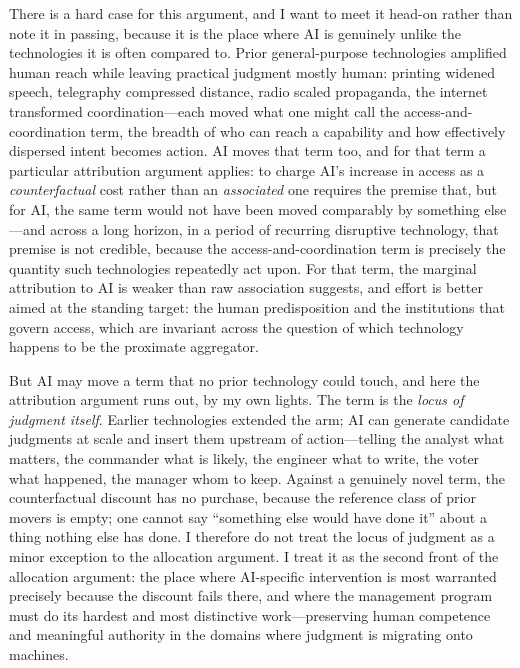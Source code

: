 \documentclass[11pt]{article}
\begin{document}
There is a hard case for this argument, and I want to meet it head-on rather than note it in passing, because it is the place where AI is genuinely unlike the technologies it is often compared to. Prior general-purpose technologies amplified human reach while leaving practical judgment mostly human: printing widened speech, telegraphy compressed distance, radio scaled propaganda, the internet transformed coordination---each moved what one might call the access-and-coordination term, the breadth of who can reach a capability and how effectively dispersed intent becomes action. AI moves that term too, and for that term a particular attribution argument applies: to charge AI's increase in access as a \emph{counterfactual} cost rather than an \emph{associated} one requires the premise that, but for AI, the same term would not have been moved comparably by something else---and across a long horizon, in a period of recurring disruptive technology, that premise is not credible, because the access-and-coordination term is precisely the quantity such technologies repeatedly act upon. For that term, the marginal attribution to AI is weaker than raw association suggests, and effort is better aimed at the standing target: the human predisposition and the institutions that govern access, which are invariant across the question of which technology happens to be the proximate aggregator.

But AI may move a term that no prior technology could touch, and here the attribution argument runs out, by my own lights. The term is the \emph{locus of judgment itself}. Earlier technologies extended the arm; AI can generate candidate judgments at scale and insert them upstream of action---telling the analyst what matters, the commander what is likely, the engineer what to write, the voter what happened, the manager whom to keep. Against a genuinely novel term, the counterfactual discount has no purchase, because the reference class of prior movers is empty; one cannot say ``something else would have done it'' about a thing nothing else has done. I therefore do not treat the locus of judgment as a minor exception to the allocation argument. I treat it as the second front of the allocation argument: the place where AI-specific intervention is most warranted precisely because the discount fails there, and where the management program must do its hardest and most distinctive work---preserving human competence and meaningful authority in the domains where judgment is migrating onto machines.
\end{document}
